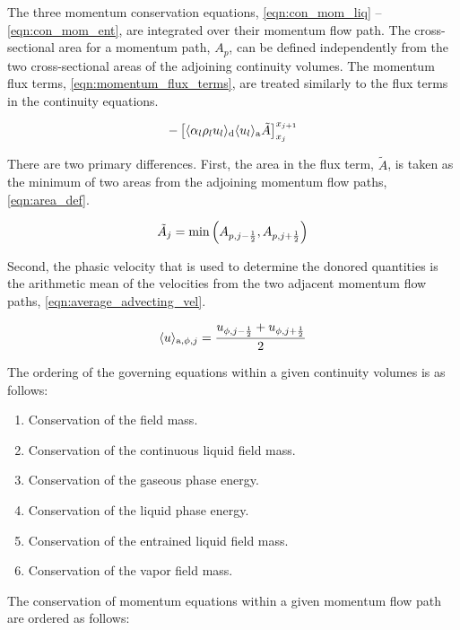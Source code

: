 The three momentum conservation equations, \eqref{eqn:con_mom_liq} -- \eqref{eqn:con_mom_ent}, are integrated over their momentum flow path.
The cross-sectional area for a momentum path, $A_{p}$, can be defined independently from the two cross-sectional areas of the adjoining continuity volumes.
The momentum flux terms, \eqref{eqn:momentum_flux_terms}, are treated similarly to the flux terms in the continuity equations.

\begin{equation}
\label{eqn:momentum_flux_terms}
-\left[\don{\alpha_l \rho_l u_l}_{\text{d}} \ave{u_{l}}_{\text{a}} \tilde{A}\right]_{x_{j }}^{x_{j + 1}}
\end{equation}

There are two primary differences.
First, the area in the flux term, $\tilde{A}$, is taken as the minimum of two areas from the adjoining momentum flow paths, \eqref{eqn:area_def}.

\begin{equation}
\label{eqn:area_def}
\tilde{A}_{j} = \min\left(A_{p,j - \onehalf}, A_{p,j+\onehalf}\right)
\end{equation}

Second, the phasic velocity that is used to determine the donored quantities is the arithmetic mean of the velocities from the two adjacent momentum flow paths, \eqref{eqn:average_advecting_vel}.

\begin{equation}
\label{eqn:average_advecting_vel}
\ave{u}_{\text{a},\phi, j} = \frac{u_{\phi, j - \onehalf} + u_{\phi, j+ \onehalf}}{2}
\end{equation}

The ordering of the governing equations within a given continuity volumes is as follows:

\begin{enumerate}
\item{Conservation of the \ncg{} field mass.}
\item{Conservation of the continuous liquid field mass.}
\item{Conservation of the gaseous phase energy.}
\item{Conservation of the liquid phase energy.}
\item{Conservation of the entrained liquid field mass.}
\item{Conservation of the vapor field mass.}
\end{enumerate}

The conservation of momentum equations within a given momentum flow path are ordered as follows:

